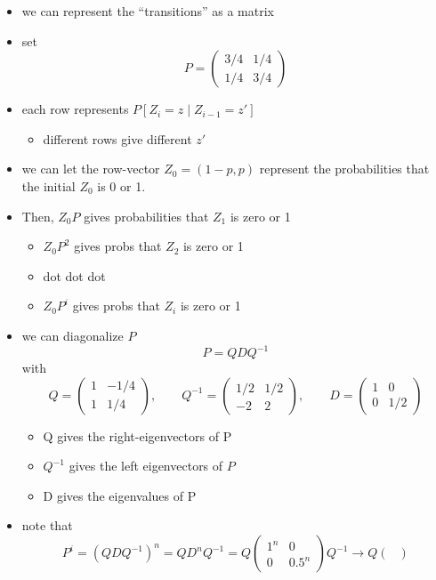 \begin{itemize}
\item we can represent the ``transitions'' as a matrix
\item set $$P = \begin{pmatrix} 3/4 & 1/4 \\ 1/4 & 3/4 \end{pmatrix}$$
\item each row represents $P[Z_i = z \mid Z_{i-1} = z']$
\begin{itemize}
\item different rows give different $z'$
\end{itemize}
\item we can let the row-vector $Z_0 = (1-p, p)$ represent the
        probabilities that the initial $Z_0$ is 0 or 1.
\item Then, $Z_0 P$ gives probabilities that $Z_1$ is zero or 1
\begin{itemize}
\item $Z_0 P^2$ gives probs that $Z_2$ is zero or 1
\item dot dot dot
\item $Z_0 P^i$ gives probs that $Z_i$ is zero or 1
\end{itemize}
\item we can diagonalize $P$
        \[P = Q D Q^{-1}\]
        with
        \[Q = \begin{pmatrix} 1 & -1/4 \\ 1 &
        1/4 \end{pmatrix},\qquad 
        Q^{-1} = \begin{pmatrix} 1/2 & 1/2 \\ -2 & 2 \end{pmatrix},
        \qquad 
        D = \begin{pmatrix} 1 & 0 \\ 0 & 1/2 \end{pmatrix}\]
\begin{itemize}
\item Q gives the right-eigenvectors of P
\item $Q^{-1}$ gives the left eigenvectors of $P$
\item D gives the eigenvalues of P
\end{itemize}
\item note that 
        \[P^{i} = (Q D Q^{-1})^n = Q D^n Q^{-1} = Q \begin{pmatrix}
        1^n & 0 \\ 0 & 0.5^n \end{pmatrix} Q^{-1} \to Q \begin{pmatrix}

\end{pmatrix}\]
\end{itemize}
